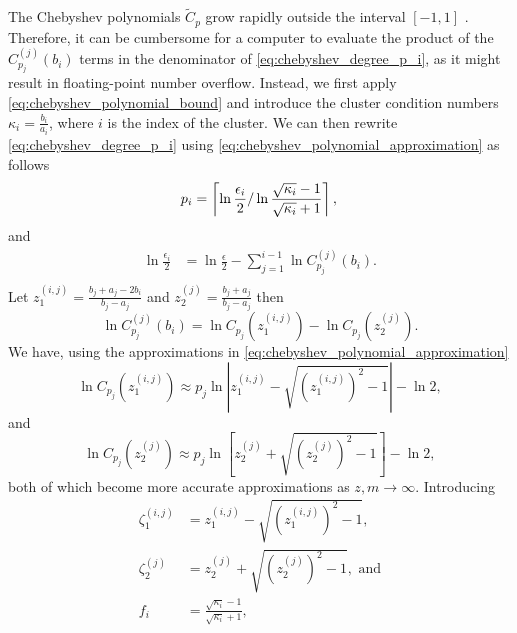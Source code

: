 The Chebyshev polynomials $\tilde{C}_p$ grow rapidly outside the interval $[-1,1]$ \cite[Section 4]{cg_sharpened_convrate_Axelsson1976}. Therefore, it can be cumbersome for a computer to evaluate the product of the $C^{(j)}_{p_j}(b_i)$ terms in the denominator of \cref{eq:chebyshev_degree_p_i}, as it might result in floating-point number overflow. Instead, we first apply \cref{eq:chebyshev_polynomial_bound} and introduce the cluster condition numbers $\kappa_i = \frac{b_i}{a_i}$, where $i$ is the index of the cluster. We can then rewrite \cref{eq:chebyshev_degree_p_i} using \cref{eq:chebyshev_polynomial_approximation} as follows
\begin{equation*}
    p_i  =  \left\lceil\ln{\frac{\epsilon_i}{2}} / \ln{\frac{\sqrt{\kappa_i} - 1}{\sqrt{\kappa_i} + 1}}\right\rceil, \\
\end{equation*}
and
\begin{align*}
    \ln{\frac{\epsilon_i}{2}} & = \ln{\frac{\epsilon}{2}} - \sum_{j=1}^{i-1} \ln{C^{(j)}_{p_j}(b_i)}. \\
\end{align*}
Let $z^{(i,j)}_1 = \frac{b_j + a_j - 2b_i}{b_j - a_j}$ and $z^{(j)}_2 = \frac{b_j + a_j}{b_j - a_j}$ then
\begin{equation*}
    \ln{C^{(j)}_{p_j}(b_i)} = \ln{C_{p_j}(z^{(i,j)}_1)} - \ln{C_{p_j}(z^{(j)}_2)}.
\end{equation*}
We have, using the approximations in \cref{eq:chebyshev_polynomial_approximation}
\begin{equation}
    \ln{C_{p_j}(z^{(i,j)}_1)} \approx p_j \ln{\left|z^{(i,j)}_1 - \sqrt{\left(z^{(i,j)}_1\right)^2 - 1}\right|} - \ln{2},
    \label{eq:chebyshev_polynomial_bound_z1}
\end{equation}
and
\begin{equation}
    \ln{C_{p_j}(z^{(j)}_2)} \approx p_j \ln{\left[z^{(j)}_2 + \sqrt{\left(z^{(j)}_2\right)^2 - 1}\right]} - \ln{2},
    \label{eq:chebyshev_polynomial_bound_z2}
\end{equation}
both of which become more accurate approximations as $z,m\rightarrow\infty$. Introducing
\begin{align*}
    \zeta^{(i,j)}_1 & = z^{(i,j)}_1 - \sqrt{\left(z^{(i,j)}_1\right)^2 - 1},         \\
    \zeta^{(j)}_2   & = z^{(j)}_2 + \sqrt{\left(z^{(j)}_2\right)^2 - 1}, \text{ and} \\
    f_i             & = \frac{\sqrt{\kappa_i} - 1}{\sqrt{\kappa_i} + 1},
\end{align*}

